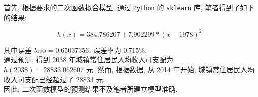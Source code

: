 \documentclass{article}
\begin{document}
首先, 根据要求的二次函数拟合模型, 通过 \texttt{Python} 的 \texttt{sklearn} 库, 笔者得到了如下的结果:

$$
  h\left(x\right) = 384.786207 + 7.902299 * \left(x-1978\right)^2
$$

\indent 其中误差 $loss = 0.65037356$, 误差率为 $0.715\%$.\\
\indent 通过预测, 得到 2038 年城镇常住居民人均收入可支配为 $h\left(2038\right) = 28833.062607$ 元. 然而, 根据数据, 从 2014 年开始, 城镇常住居民人均收入可支配已经超过了 28833 元.\\
\indent 因此, 二次函数模型的预测结果不及笔者所建立模型准确.\\
\end{document}
